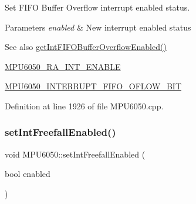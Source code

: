 Set F\+I\+FO Buffer Overflow interrupt enabled status. 
\begin{DoxyParams}{Parameters}
{\em enabled} & New interrupt enabled status \\
\hline
\end{DoxyParams}
\begin{DoxySeeAlso}{See also}
\mbox{\hyperlink{classMPU6050_a55f99c88cc84901f245924ed5e3fe47e}{get\+Int\+F\+I\+F\+O\+Buffer\+Overflow\+Enabled()}} 

\mbox{\hyperlink{MPU6050_8h_a1de9d9557aa7420c746721999df4a377}{M\+P\+U6050\+\_\+\+R\+A\+\_\+\+I\+N\+T\+\_\+\+E\+N\+A\+B\+LE}} 

\mbox{\hyperlink{MPU6050_8h_a9d13e0ea2a96e5d234b7efa3de74d6bf}{M\+P\+U6050\+\_\+\+I\+N\+T\+E\+R\+R\+U\+P\+T\+\_\+\+F\+I\+F\+O\+\_\+\+O\+F\+L\+O\+W\+\_\+\+B\+IT}} 
\end{DoxySeeAlso}


Definition at line 1926 of file M\+P\+U6050.\+cpp.


\begin{DoxyCode}{0}

\end{DoxyCode}
\mbox{\label{classMPU6050_a01a24a05f06463d5277e1670d6260e03}} 
\subsubsection{\texorpdfstring{setIntFreefallEnabled()}{setIntFreefallEnabled()}}
{\footnotesize\ttfamily void M\+P\+U6050\+::set\+Int\+Freefall\+Enabled (\begin{DoxyParamCaption}\item[{bool}]{enabled }\end{DoxyParamCaption})}

